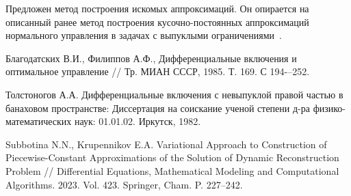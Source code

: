 Предложен метод построения искомых аппроксимаций. Он опирается на описанный ранее метод построения кусочно-постоянных аппроксимаций нормального управления в задачах с выпуклыми ограничениями~\cite{Krupennikov:subb4}.





%



\begin{thebibliography}{9} %

Благодатских В.И., Филиппов А.Ф., Дифференциальные включения и оптимальное управление // Тр. МИАН СССР, 1985. Т. 169. С 194-–252.

 Толстоногов А.А. Дифференциальные включения с невыпуклой правой частью в банаховом пространстве: Диссертация на соискание ученой степени д-ра физико-математических наук: 01.01.02. Иркутск, 1982.

	Subbotina N.N., Krupennikov E.A. Variational Approach to Construction of Piecewise-Constant Approximations of the Solution of Dynamic Reconstruction Problem  // Differential Equations, Mathematical Modeling and Computational Algorithms. 2023. Vol. 423. Springer, Cham. P. 227--242.
\end{thebibliography}





%

